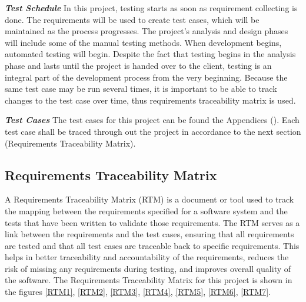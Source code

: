 \begin{justify}
    \vspace{0.25cm}
    \newendline \textbf{\textit{Test Schedule}}\newendline
    In this project, testing starts as soon as requirement collecting is done. The requirements will be used to create test cases, which will be maintained as the process progresses. The project's analysis and design phases will include some of the manual testing methods. When development begins, automated  testing will begin. Despite the fact that testing begins in the analysis phase and lasts until the project is handed over to the client, testing is an integral part of the development process from the very beginning. Because the same test case may be run several times, it is important to be able to track changes to the test case over time, thus requirements traceability matrix is used.

    \vspace{0.25cm}
    \newendline \textbf{\textit{Test Cases}}\newendline
    The test cases for this project can be found the Appendices (\pageref{Appendix 3}). Each test case shall be traced through out the project in accordance to the next section (Requirements Traceability Matrix).\\
\end{justify}


\newendline\subsection{Requirements Traceability Matrix}
\begin{justify}
    A Requirements Traceability Matrix (RTM) is a document or tool used to track the mapping between the requirements specified for a software system and the tests that have been written to validate those requirements. The RTM serves as a link between the requirements and the test cases, ensuring that all requirements are tested and that all test cases are traceable back to specific requirements. This helps in better traceability and accountability of the requirements, reduces the risk of missing any requirements during testing, and improves overall quality of the software. The Requirements Traceability Matrix for this project is shown in the figures \ref{RTM1}, \ref{RTM2}, \ref{RTM3}, \ref{RTM4}, \ref{RTM5}, \ref{RTM6}, \ref{RTM7}.
    \newendline
\end{justify}


    



